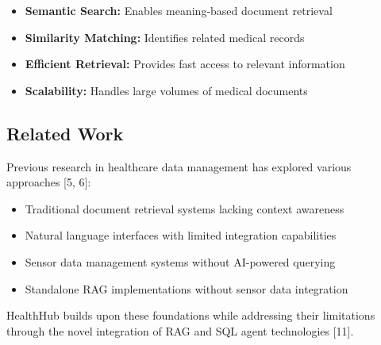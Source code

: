\begin{itemize}
\item \textbf{Semantic Search:} Enables meaning-based document retrieval
\item \textbf{Similarity Matching:} Identifies related medical records
\item \textbf{Efficient Retrieval:} Provides fast access to relevant information
\item \textbf{Scalability:} Handles large volumes of medical documents
\end{itemize}

\subsection{Related Work}
Previous research in healthcare data management has explored various approaches [5, 6]:

\begin{itemize}
\item Traditional document retrieval systems lacking context awareness
\item Natural language interfaces with limited integration capabilities
\item Sensor data management systems without AI-powered querying
\item Standalone RAG implementations without sensor data integration
\end{itemize}

HealthHub builds upon these foundations while addressing their limitations through the novel integration of RAG and SQL agent technologies [11]. 